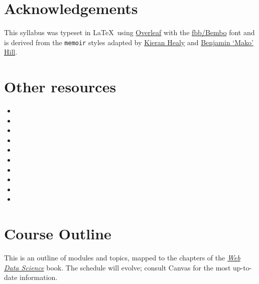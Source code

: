\documentclass[11pt]{memoir}
\def\bookurl{https://github.com/cuinfoscience/Web-Data-Science-Book}
\begin{document}
\section{Acknowledgements}
This syllabus was typeset in \LaTeX~using \href{http://www.overleaf.com}{Overleaf} with the \href{http://www.tug.dk/FontCatalogue/fbb/}{fbb/Bembo} font and is derived from the \texttt{memoir} styles adapted by \href{https://github.com/kjhealy/latex-custom-kjh}{Kieran Healy} and \href{http://projects.mako.cc/source/?p=latex_mako;a=summary}{Benjamin `Mako' Hill}.

\section{Other resources}
\begin{itemize}
    \item {}
    \item {}
    \item {}
    \item {}
    \item {}
    \item {}
    \item {}
    \item {}
    \item {}
    \item {}
\end{itemize}

\clearpage
\section{Course Outline}

This is an outline of modules and topics, mapped to the chapters of the \href{\bookurl}{\textit{Web Data Science}} book. The schedule will evolve; consult Canvas for the most up-to-date information.
\end{document}
